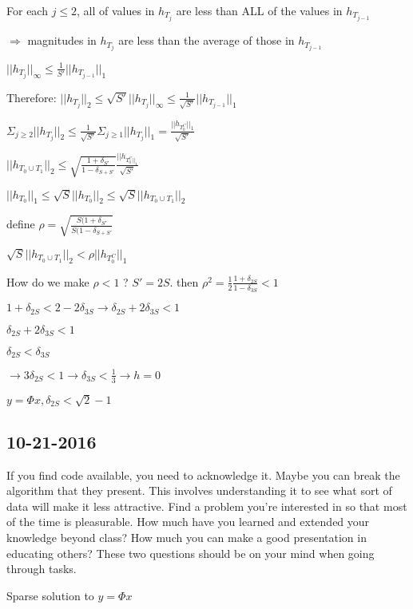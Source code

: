 \documentclass[12pt,letterpaper]{report}
\begin{document}
For each $j \leq 2$, all of values in $h_{T_j}$ are less than ALL of the values in $h_{T_{j-1}}$

$\Rightarrow$ magnitudes in $h_{T_j}$ are less than the average of those in $h_{T_{j-1}}$

$||h_{T_{j}}||_\infty \leq \frac{1}{S'} ||h_{T_{j-1}}||_1$

Therefore: $||h_{T_{j}}||_2 \leq \sqrt{S'} ||h_{T_{j}}||_\infty \leq \frac{1}{\sqrt{S'}} ||h_{T_{j-1}}||_1$

$\Sigma_{j \geq 2}||h_{T_{j}}||_2 \leq \frac{1}{\sqrt{S'}} \Sigma_{j \geq 1} ||h_{T_{j}}||_1 = \frac{||h_{T_0^C}||_1}{\sqrt{S'}}$

$||h_{T_0 \cup T_1}||_2 \leq \sqrt{\frac{1+ \delta_{S'}}{1 - \delta_{S+S'}}} \frac{||h_{T_0^C||_1}}{\sqrt{S'}}$

$||h_{T_0}||_1 \leq \sqrt{S} ||h_{T_0}||_2 \leq \sqrt{S}||h_{T_0 \cup T_1}||_2$

define $\rho = \sqrt{\frac{S(1+\delta_{S'}}{S(1-\delta_{S+S'}}}$

$\sqrt{S}||h_{T_0 \cup T_1}||_2 < \rho ||h_{T_0^C}||_1$

How do we make  $\rho < 1$ ? $S' = 2S$. then $\rho^2 = \frac{1}{2}\frac{1 + \delta_{2S}}{1 - \delta_{3S}} < 1$

$1 + \delta_{2S} < 2 - 2\delta_{3S} \rightarrow \delta_{2S} + 2\delta_{3S} < 1$

$\delta_{2S} + 2\delta_{3S} < 1$

$\delta_{2S} < \delta_{3S}$

$\rightarrow 3 \delta_{2S} < 1 \rightarrow \delta_{3S} < \frac{1}{3} \rightarrow h = 0$

$y = \Phi x, \delta_{2S} < \sqrt{2} - 1$

\subsection*{10-21-2016}

If you find code available, you need to acknowledge it.  Maybe you can break the algorithm that they present.  This involves understanding it to see what sort of data will make it less attractive.  Find a problem you're interested in so that most of the time is pleasurable.  How much have you learned and extended your knowledge beyond class?  How much you can make a good presentation in educating others?  These two questions should be on your mind when going through tasks.

Sparse solution to $y = \Phi x$
\end{document}
